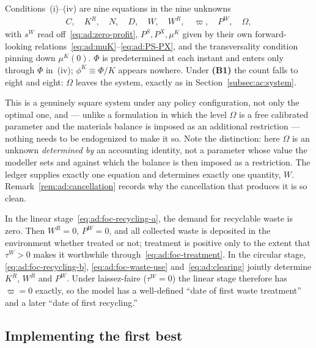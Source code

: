  Conditions~(i)--(iv) are nine equations in the nine unknowns
\begin{align*}
C,\quad K^R,\quad N,\quad D,\quad W,\quad W^R,\quad \varpi,\quad P^W,\quad \Omega,
\end{align*}
with $s^W$ read off~\eqref{eq:ad:zero-profit}, $P^S,P^X,\mu^K$ given by their own forward-looking relations~\eqref{eq:ad:muK}--\eqref{eq:ad:PS-PX}, and the transversality condition pinning down $\mu^K(0)$. $\Phi$ is predetermined at each instant and enters only through $\dot\Phi$ in~(iv); $\phi^K\equiv\Phi/K$ appears nowhere. Under \textbf{(B1)} the count falls to eight and eight: $\Omega$ leaves the system, exactly as in Section~\ref{subsec:ac:system}.

This is a genuinely square system under any policy configuration, not only the optimal one, and --- unlike a formulation in which the level $\Omega$ is a free calibrated parameter and the materials balance is imposed as an additional restriction --- nothing needs to be endogenized to make it so. Note the distinction: here $\Omega$ is an unknown \emph{determined by} an accounting identity, not a parameter whose value the modeller sets and against which the balance is then imposed as a restriction. The ledger supplies exactly one equation and determines exactly one quantity, $W$. Remark~\ref{rem:ad:cancellation} records why the cancellation that produces it is so clean.

 In the linear stage~\eqref{eq:ad:foc-recycling-a}, the demand for recyclable waste is zero. Then $W^R=0$, $P^W=0$, and all collected waste is deposited in the environment whether treated or not; treatment is positive only to the extent that $\tau^W>0$ makes it worthwhile through~\eqref{eq:ad:foc-treatment}. In the circular stage, \eqref{eq:ad:foc-recycling-b}, \eqref{eq:ad:foc-waste-use} and~\eqref{eq:ad:clearing} jointly determine $K^R$, $W^R$ and $P^W$. Under laissez-faire ($\tau^W=0$) the linear stage therefore has $\varpi=0$ exactly, so the model has a well-defined ``date of first waste treatment'' and a later ``date of first recycling.''

\subsection{Implementing the first best}
\label{subsec:ad:implementation}

